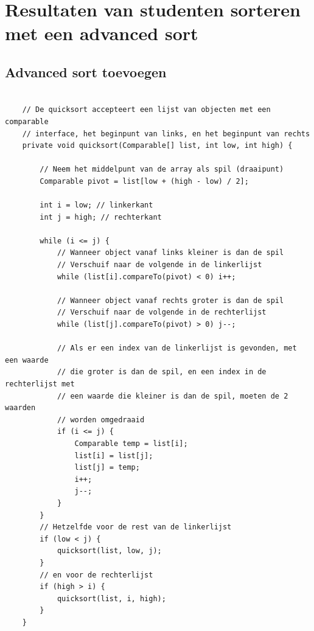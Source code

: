 \documentclass[12pt,notitlepage]{article}
\begin{document}
\renewcommand{\contentsname}{Inhoudsopgave}
\tableofcontents
\clearpage


\section{Resultaten van studenten sorteren met een advanced sort}
\subsection{Advanced sort toevoegen}

\begin{lstlisting}

    // De quicksort accepteert een lijst van objecten met een comparable
    // interface, het beginpunt van links, en het beginpunt van rechts
    private void quicksort(Comparable[] list, int low, int high) {

        // Neem het middelpunt van de array als spil (draaipunt)
        Comparable pivot = list[low + (high - low) / 2];

        int i = low; // linkerkant
        int j = high; // rechterkant

        while (i <= j) {
            // Wanneer object vanaf links kleiner is dan de spil
            // Verschuif naar de volgende in de linkerlijst
            while (list[i].compareTo(pivot) < 0) i++;

            // Wanneer object vanaf rechts groter is dan de spil
            // Verschuif naar de volgende in de rechterlijst
            while (list[j].compareTo(pivot) > 0) j--;

            // Als er een index van de linkerlijst is gevonden, met een waarde
            // die groter is dan de spil, en een index in de rechterlijst met
            // een waarde die kleiner is dan de spil, moeten de 2 waarden
            // worden omgedraaid
            if (i <= j) {
                Comparable temp = list[i];
                list[i] = list[j];
                list[j] = temp;
                i++;
                j--;
            }
        }
        // Hetzelfde voor de rest van de linkerlijst
        if (low < j) {
            quicksort(list, low, j);
        }
        // en voor de rechterlijst
        if (high > i) {
            quicksort(list, i, high);
        }
    }
\end{lstlisting}
\end{document}
